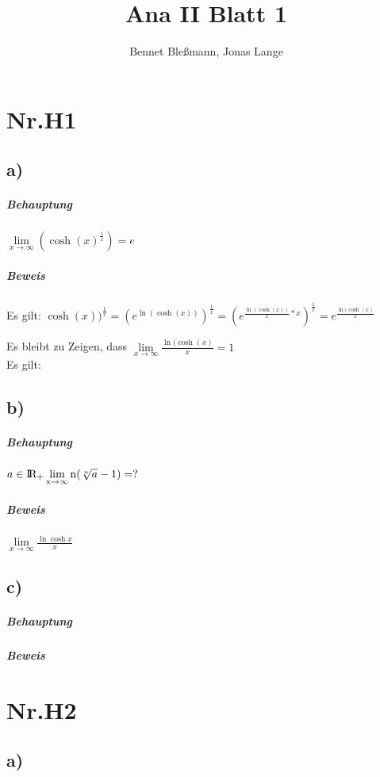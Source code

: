 \documentclass[12pt,a4paper,oneside,ngerman]{article}
\title{Ana II Blatt 1}
\author{Bennet Bleßmann, Jonas Lange}
\begin{document}
\maketitle
\section*{Nr.H1}
\subsection*{a)}

\subparagraph*{Behauptung}

$\lim\limits_{x \to \infty}(\cosh(x)^{\frac{1}{x}}) = e$

\subparagraph*{Beweis}

Es gilt: $\cosh(x))^{\frac{1}{x}} = (e^{\ln(\cosh(x))})^{\frac{1}{x}}
= (e^{\frac {\ln(\cosh(x))}{x}*x})^{\frac{1}{x}} = e^{\frac{\ln(\cosh(x)}{x}}$

Es bleibt zu Zeigen, dass $\lim\limits_{x \to \infty}\frac{\ln(\cosh(x)}{x} = 1 $\\ 
\indent Es gilt:  


	
\subsection*{b)}

\subparagraph*{Behauptung}

$a \in \rm I \!R_{+} \lim\limits_{x \to \infty} n(\sqrt[n]{a}-1) = ?$


\subparagraph*{Beweis}

$\lim\limits_{x \to \infty } \frac{\ln{\cosh{x}}}{x} $





\subsection*{c)}

\subparagraph*{Behauptung}

\subparagraph*{Beweis}

\section*{Nr.H2}

\subsection*{a)}
\end{document}
